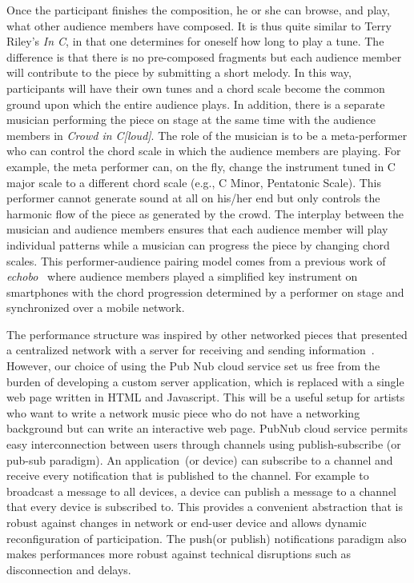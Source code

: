 Once the participant finishes the composition, he or she can browse, and play, what other audience members have composed. 
It is thus quite similar to Terry Riley's \textit{In C}, in that one determines for oneself how long to play a tune. 
The difference is that there is no pre-composed fragments but each audience member will contribute to the piece by submitting a short melody.
In this way, participants will have their own tunes and a chord scale become the common ground upon which the entire audience plays. 
In addition, there is a separate musician performing the piece on stage at the same time with the audience members in \textit{Crowd in C[loud]}.
The role of the musician is to be a meta-performer who can control the chord scale in which the audience members are playing.
For example, the meta performer can, on the fly, change the instrument tuned in C major scale to a different chord scale (e.g., C Minor, Pentatonic Scale). 
This performer cannot generate sound at all on his/her end but only controls the harmonic flow of the piece as generated by the crowd.
The interplay between the musician and audience members ensures that each audience member will play individual patterns while a musician can progress the piece by changing chord scales. 
This performer-audience pairing model comes from a previous work of \textit{echobo}~\citep{Lee2013echobo} where audience members played a simplified key instrument on smartphones with the chord progression determined by a performer on stage and synchronized over a mobile network.

The performance structure was inspired by other networked pieces that presented a centralized network with a server for receiving and sending information~\citep{Weinberg2005interconnected}.
However, our choice of using the Pub Nub cloud service set us free from the burden of developing a custom server application, which is replaced with a single web page written in HTML and Javascript.
This will be a useful setup for artists who want to write a network music piece who do not have a networking background but can write an interactive web page.
PubNub cloud service permits easy interconnection between users through channels using publish-subscribe (or pub-sub paradigm).
An application~(or device) can subscribe to a channel and receive every notification that is published to the channel. 
For example to broadcast a message to all devices, a device can publish a message to a channel that every device is subscribed to. 
This provides a convenient abstraction that is robust against changes in network or end-user device and allows dynamic reconfiguration of participation.
The push(or publish) notifications paradigm also makes performances more robust against technical disruptions such as disconnection and delays.

